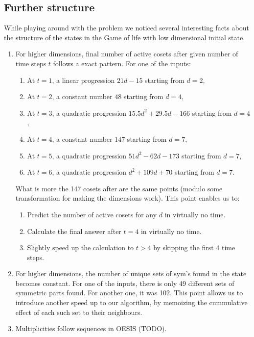 \documentclass[]{article}
\newcommand{\sym}{\mathrm{sym}}
\begin{document}
	\subsection{Further structure}
	While playing around with the problem we noticed several interesting facts about the structure of the states in the Game of life with low dimensional initial state.
	\begin{enumerate}
		\item For higher dimensions, final number of active cosets after given number of time steps $t$ follows a exact pattern. For one of the inputs:
		\begin{enumerate}
			\item At $t=1$, a linear progression $21d - 15$ starting from $d=2$,
			\item At $t=2$, a constant number $48$ starting from $d=4$,
			\item At $t=3$, a quadratic progression $15.5d^2 + 29.5d - 166$ starting from $d=4$,
			\item At $t=4$, a constant number $147$ starting from $d=7$,
			\item At $t=5$, a quadratic progression $51d^2 - 62d - 173$ starting from $d=7$,
			\item At $t=6$, a quadratic progression $d^2 + 109d + 70$ starting from $d=7$.
		\end{enumerate}
		What is more the 147 cosets after are the same points (modulo some transformation for making the dimensions work).
		This point enables us to:
		\begin{enumerate}
			\item Predict the number of active cosets for any $d$ in virtually no time.
			\item Calculate the final answer after $t=4$ in virtually no time.
			\item Slightly speed up the calculation to $t>4$ by skipping the first 4 time steps.
		\end{enumerate}
		
		\item For higher dimensions, the number of unique sets of $\sym$'s found in the state becomes constant. For one of the inputs,
		there is only 49 different sets of symmetric parts found. For another one, it was 102.
		This point allows us to introduce another speed up to our algorithm, by memoizing the cummulative effect of each such set to their neighbours.
		
		\item Multiplicities follow sequences in OESIS (TODO).
	\end{enumerate}
\end{document}

